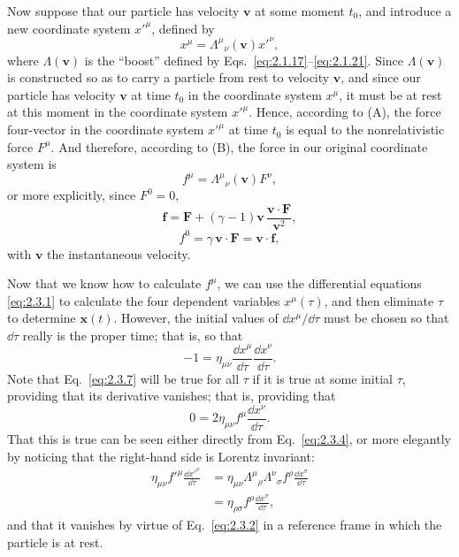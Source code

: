 Now suppose that our particle has velocity \(\mathbf v\) at some moment \(t_0\),
and introduce a new coordinate system \(x'^\mu\), defined by
\[
  x^\mu=\Lambda^\mu{}_\nu(\mathbf v)x'^\nu ,
\]
where \(\Lambda(\mathbf v)\) is the ``boost'' defined by
Eqs.~\eqref{eq:2.1.17}--\eqref{eq:2.1.21}. Since
\(\Lambda(\mathbf v)\) is constructed so as to carry a particle from rest to
velocity \(\mathbf v\), and since our particle has velocity \(\mathbf v\) at
time \(t_0\) in the coordinate system \(x^\mu\), it must be at rest at this
moment in the coordinate system \(x'^\mu\). Hence, according to (A), the force
four-vector in the coordinate system \(x'^\mu\) at time \(t_0\) is equal to the
nonrelativistic force \(F^\mu\). And therefore, according to (B), the force in
our original coordinate system is
\begin{equation}
  f^\mu=\Lambda^\mu{}_\nu(\mathbf v)F^\nu ,
  \tag{2.3.4}\label{eq:2.3.4}
\end{equation}
or more explicitly, since \(F^0=0\),
\begin{equation}
  \mathbf f=\mathbf F+(\gamma-1)\mathbf v\,
  \frac{\mathbf v\cdot\mathbf F}{\mathbf v^2},
  \tag{2.3.5}\label{eq:2.3.5}
\end{equation}
\begin{equation}
  f^0=\gamma\,\mathbf v\cdot\mathbf F=\mathbf v\cdot\mathbf f ,
  \tag{2.3.6}\label{eq:2.3.6}
\end{equation}
with \(\mathbf v\) the instantaneous velocity.

Now that we know how to calculate \(f^\mu\), we can use the differential
equations \eqref{eq:2.3.1} to calculate the four dependent variables
\(x^\mu(\tau)\), and then eliminate \(\tau\) to determine \(\mathbf{x}(t)\).
However, the initial values of \(\dd x^\mu/\dd\tau\) must be chosen so that
\(\dd\tau\) really is the proper time; that is, so that
\begin{equation}
  -1=\eta_{\mu\nu}
  \frac{\dd x^\mu}{\dd\tau}\frac{\dd x^\nu}{\dd\tau}.
  \tag{2.3.7}\label{eq:2.3.7}
\end{equation}
Note that Eq.~\eqref{eq:2.3.7} will be true for all \(\tau\) if it is true at
some initial \(\tau\), providing that its derivative vanishes; that is,
providing that
\begin{equation}
  0=2\eta_{\mu\nu}f^\mu\frac{\dd x^\nu}{\dd\tau}.
  \tag{2.3.8}\label{eq:2.3.8}
\end{equation}
That this is true can be seen either directly from Eq.~\eqref{eq:2.3.4}, or
more elegantly by noticing that the right-hand side is Lorentz invariant:
\[
\begin{aligned}
  \eta_{\mu\nu}f'^\mu\frac{\dd x'^\nu}{\dd\tau}
  &=\eta_{\mu\nu}\Lambda^\mu{}_\rho\Lambda^\nu{}_\sigma
    f^\rho\frac{\dd x^\sigma}{\dd\tau}\\
  &=\eta_{\rho\sigma}f^\rho\frac{\dd x^\sigma}{\dd\tau},
\end{aligned}
\]
and that it vanishes by virtue of Eq.~\eqref{eq:2.3.2} in a reference frame in
which the particle is at rest.
